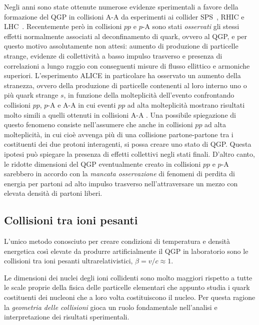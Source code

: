     Negli anni sono state ottenute numerose evidenze sperimentali a favore della formazione del QGP in collisioni A-A da esperimenti ai collider SPS~\cite{NA60_2021}, RHIC e LHC~\cite{ALICE_2024}. Recentemente però in collisioni $pp$ e $p$-A sono stati \textit{osservati} gli stessi effetti normalmente associati al deconfinamento di quark, ovvero al QGP, e per questo motivo assolutamente non attesi: aumento di produzione di particelle strange, evidenze di collettività a basso impulso trasverso e presenza di correlazioni a lungo raggio con conseguenti misure di flusso ellittico e armoniche superiori. L'esperimento ALICE in particolare ha osservato un aumento della stranezza, ovvero della produzione di particelle contenenti al loro interno uno o più quark strange $s$, in funzione della molteplicità dell'evento \cite{ALICE_2008} confrontando collisioni $pp$, $p$-A e A-A in cui eventi $pp$ ad alta molteplicità mostrano risultati molto simili a quelli ottenuti in collisioni A-A \cite{RHIC_2020} \cite{ALICE_2017_pp} \cite{ALICE_2024_pp_pPb_PbPb}. Una possibile spiegazione di questo fenomeno consiste nell'assumere che anche in collisioni $pp$ ad alta molteplicità, in cui cioè avvenga più di una collisione partone-partone tra i costituenti dei due protoni interagenti, si possa creare uno stato di QGP. Questa ipotesi può spiegare la presenza di effetti collettivi negli stati finali. D'altro canto, le ridotte dimensioni del QGP eventualmente creato in collisioni $pp$ e $p$-A sarebbero in accordo con la \textit{mancata osservazione} di fenomeni di perdita di energia per partoni ad alto impulso trasverso nell'attraversare un mezzo con elevata densità di partoni liberi.

    \subsection{Collisioni tra ioni pesanti}
        L'unico metodo conosciuto per creare condizioni di temperatura e densità energetica così elevate da produrre artificialmente il QGP in laboratorio sono le collisioni tra ioni pesanti ultrarelativistici, $\beta = v/c \approx 1$.

        Le dimensioni dei nuclei degli ioni collidenti sono molto maggiori rispetto a tutte le scale proprie della fisica delle particelle elementari che appunto studia i quark costituenti dei nucleoni che a loro volta costituiscono il nucleo. Per questa ragione la \textit{geometria delle collisioni} gioca un ruolo fondamentale nell'analisi e interpretazione dei risultati sperimentali.


